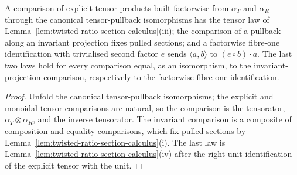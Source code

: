 \begin{lemma}
\label{lem:twisted-ratio-comparison-laws}
\leanok
A comparison of explicit tensor products built factorwise from $\alpha_T$ and
$\alpha_R$ through the canonical tensor-pullback isomorphisms has the tensor
law of Lemma~\ref{lem:twisted-ratio-section-calculus}(iii); the comparison of
a pullback along an invariant projection fixes pulled sections; and a
factorwise fibre-one identification with trivialised second factor $e$ sends
$\langle a,b\rangle$ to $(e\circ b)\cdot a$.  The last two laws hold for every
comparison equal, as an isomorphism, to the invariant-projection comparison,
respectively to the factorwise fibre-one identification.
\end{lemma}
\begin{proof}
Unfold the canonical tensor-pullback isomorphisms; the explicit and monoidal
tensor comparisons are natural, so the comparison is the tensorator,
$\alpha_T\otimes\alpha_R$, and the inverse tensorator.  The invariant
comparison is a composite of composition and equality comparisons, which
fix pulled sections by Lemma~\ref{lem:twisted-ratio-section-calculus}(i).
The last law is Lemma~\ref{lem:twisted-ratio-section-calculus}(iv) after the
right-unit identification of the explicit tensor with the unit.
\end{proof}

